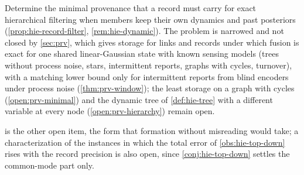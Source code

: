 \begin{openproblem}\label{open:hie-provenance}
Determine the minimal provenance that a record must carry for exact hierarchical filtering when members keep their own dynamics and past posteriors (\cref{prop:hie-record-filter}, \cref{rem:hie-dynamic}). The problem is narrowed and not closed by \cref{sec:prv}, which gives storage for links and records under which fusion is exact for one shared linear-Gaussian state with known sensing models (trees without process noise, stars, intermittent reports, graphs with cycles, turnover), with a matching lower bound only for intermittent reports from blind encoders under process noise (\cref{thm:prv-window}); the least storage on a graph with cycles (\cref{open:prv-minimal}) and the dynamic tree of \cref{def:hie-tree} with a different variable at every node (\cref{open:prv-hierarchy}) remain open.
\end{openproblem}

 is the other open item, the form that formation without misreading would take; a characterization of the instances in which the total error of \cref{obs:hie-top-down} rises with the record precision is also open, since \cref{conj:hie-top-down} settles the common-mode part only.
